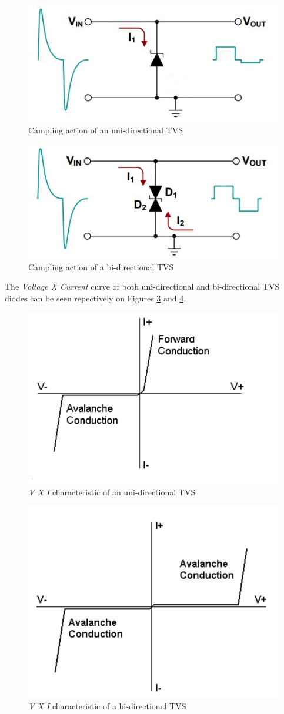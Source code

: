 			\begin{figure}[htbp]
				\centering
				\includegraphics[width=.5\textwidth]{figuras/fig-uni-tvs-clamp}
				\caption{Campling action of an uni-directional TVS \cite{uni-tvs-clamp}}
				\label{fig:uni-tvs-clamp}
			\end{figure}

			\begin{figure}[htbp]
				\centering
				\includegraphics[width=.5\textwidth]{figuras/fig-bi-tvs-clamp}
				\caption{Campling action of a bi-directional TVS \cite{bi-tvs-clamp}}
				\label{fig:bi-tvs-clamp}
			\end{figure}

			\par
			The \textit{Voltage X Current} curve of both uni-directional and bi-directional TVS diodes can be seen repectively on Figures \ref{fig:uni-tvs-curve} and \ref{fig:bi-tvs-curve}.

			\begin{figure}[htbp]
				\centering
				\includegraphics[width=.5\textwidth]{figuras/fig-uni-tvs-curve}
				\caption{\textit{V X I} characteristic of an uni-directional TVS \cite{uni-tvs-curve}}
				\label{fig:uni-tvs-curve}
			\end{figure}

			\begin{figure}[htbp]
				\centering
				\includegraphics[width=.5\textwidth]{figuras/fig-bi-tvs-curve}
				\caption{\textit{V X I} characteristic of a bi-directional TVS \cite{bi-tvs-curve}}
				\label{fig:bi-tvs-curve}
			\end{figure}


